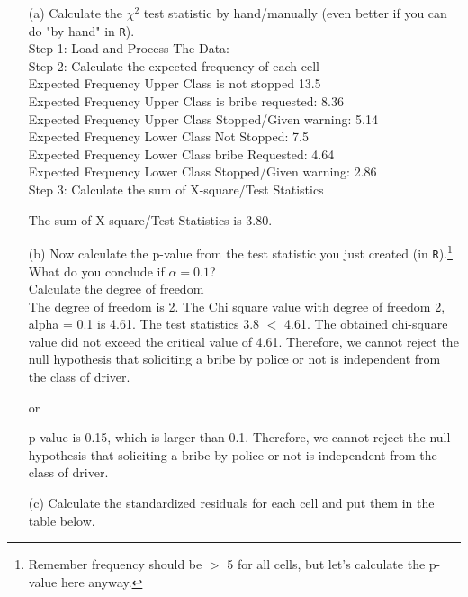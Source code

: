 \documentclass[12pt,letterpaper]{article}
\begin{document}
\begin{enumerate}
	
	\item [(a)]
	Calculate the $\chi^2$ test statistic by hand/manually (even better if you can do "by hand" in \texttt{R}).\\
	\vspace{7cm}
	Step 1: Load and Process The Data:\\ 
	
	Step 2: Calculate the expected frequency of each cell\\
	
	Expected Frequency Upper Class is not stopped 13.5\\
	Expected Frequency Upper Class is bribe requested: 8.36\\
	Expected Frequency Upper Class Stopped/Given warning: 5.14\\
	Expected Frequency Lower Class Not Stopped: 7.5\\
	Expected Frequency Lower Class bribe Requested: 4.64 \\
	Expected Frequency Lower Class Stopped/Given warning: 2.86\\
	Step 3: Calculate the sum of X-square/Test Statistics
	
	The sum of X-square/Test Statistics is 3.80.
	
	
	\item [(b)]
	Now calculate the p-value from the test statistic you just created (in \texttt{R}).\footnote{Remember frequency should be $>$ 5 for all cells, but let's calculate the p-value here anyway.}  What do you conclude if $\alpha = 0.1$?\\
	Calculate the degree of freedom\\
	
	The degree of freedom is 2.
	The Chi square value with degree of freedom 2, alpha = 0.1 is 4.61.	The test statistics 3.8 $<$ 4.61. The obtained chi-square value did not exceed the critical value of 4.61. Therefore, we cannot reject the null hypothesis that soliciting a bribe by police or not is independent from the class of driver.
	
	
	or
	
	p-value is 0.15, which is larger than 0.1. Therefore, we cannot reject the null hypothesis that soliciting a bribe by police or not is independent from the class of driver.
	\newpage
	\item [(c)] Calculate the standardized residuals for each cell and put them in the table below.
	\vspace{1cm}
	
	

\end{enumerate}
\end{document}
